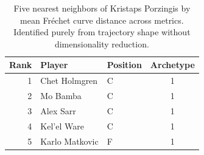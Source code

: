 \begin{table}[htbp]
  \centering\small
  \begin{tabular}{rllc}
    \toprule
    Rank & Player & Position & Archetype \\
    \midrule
    1 & Chet Holmgren & C & 1 \\
    2 & Mo Bamba & C & 1 \\
    3 & Alex Sarr & C & 1 \\
    4 & Kel'el Ware & C & 1 \\
    5 & Karlo Matkovic & F & 1 \\
    \bottomrule
  \end{tabular}
  \caption{Five nearest neighbors of Kristaps Porzingis by mean Fr\'{e}chet curve distance across metrics. Identified purely from trajectory shape without dimensionality reduction.}
  \label{tab:Kristaps_Porzingis_frechet_curve_neighbors}
\end{table}

